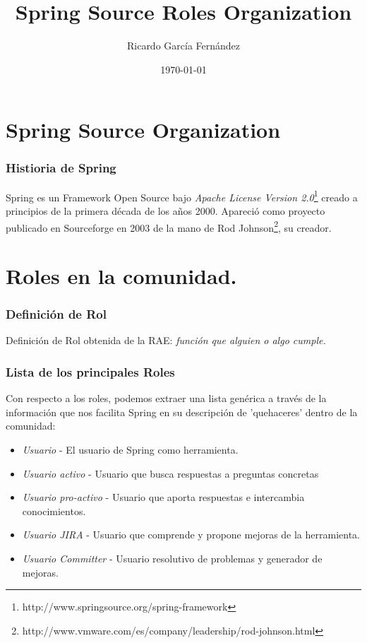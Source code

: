 \documentclass[xcolor=dvipsnames]{beamer}
\title{Spring Source Roles Organization}
\author{Ricardo Garc\'ia Fern\'andez}
\date{\today}
\begin{document}
\frame{\titlepage}

\section[\'Indice]{}
\begin{frame}[allowframebreaks]
\tableofcontents
\end{frame}

\section{Spring Source Organization}
\begin{frame}[allowframebreaks]
\frametitle{Histioria de Spring}
Spring es un Framework Open Source bajo \emph{Apache License Version 2.0}\footnote{http://www.springsource.org/spring-framework} creado a principios de la primera d\'ecada de los a\~nos 2000. Apareci\'o como proyecto publicado en Sourceforge en 2003 de la mano de Rod Johnson\footnote{http://www.vmware.com/es/company/leadership/rod-johnson.html}, su creador.
\end{frame}

\section{Roles en la comunidad.}
\begin{frame}[allowframebreaks]
\frametitle{Definici\'on de Rol}
Definici\'on de Rol obtenida de la RAE: \emph{funci\'on que alguien o algo cumple.}
\end{frame}

\begin{frame}[allowframebreaks]
\frametitle{Lista de los principales Roles}
Con respecto a los roles, podemos extraer una lista gen\'erica a trav\'es de la informaci\'on que nos facilita Spring en su descripci\'on de 'quehaceres' dentro de la comunidad:
\begin{itemize}
    \item \emph{Usuario} - El usuario de Spring como herramienta.
    \item \emph{Usuario activo} - Usuario que busca respuestas a preguntas concretas
    \item \emph{Usuario pro-activo} - Usuario que aporta respuestas e intercambia conocimientos.
    \item \emph{Usuario JIRA} - Usuario que comprende y propone mejoras de la herramienta.
    \item \emph{Usuario Committer} - Usuario resolutivo de problemas y generador de mejoras.
\end{itemize}
\end{frame}
\end{document}

